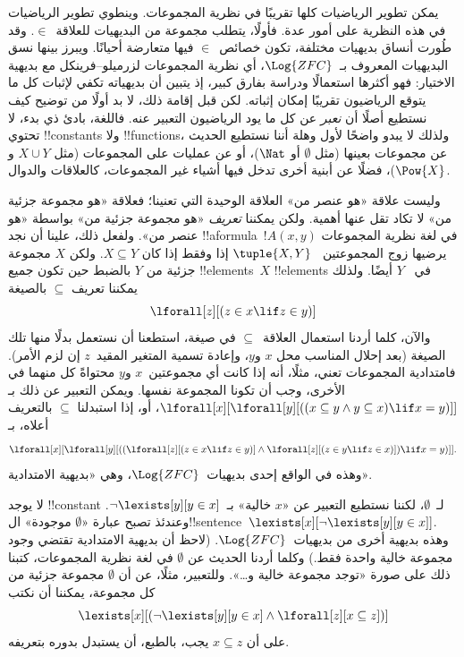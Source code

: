 \documentclass[../../../include/open-logic-section]{subfiles}
\begin{document}


يمكن تطوير الرياضيات كلها تقريبًا في نظرية المجموعات. وينطوي تطوير
الرياضيات في هذه النظرية على أمور عدة. فأولًا، يتطلب مجموعة من
البديهيات للعلاقة~$\in$. وقد طُورت أنساق بديهيات مختلفة، تكون
خصائص~$\in$ فيها متعارضة أحيانًا. ويبرز بينها نسق البديهيات المعروف
بـ~$\Log{ZFC}$، أي نظرية المجموعات لزرميلو--فرينكل مع بديهية
الاختيار: فهو أكثرها استعمالًا ودراسة بفارق كبير، إذ يتبين أن
بديهياته تكفي لإثبات كل ما يتوقع الرياضيون تقريبًا إمكان إثباته. لكن
قبل إقامة ذلك، لا بد أولًا من توضيح كيف نستطيع أصلًا أن
\emph{نعبر} عن كل ما يود الرياضيون التعبير عنه. فاللغة، بادئ ذي بدء،
لا تحتوي !!{constant}s ولا !!{function}s، ولذلك لا يبدو واضحًا لأول
وهلة أننا نستطيع الحديث عن مجموعات بعينها (مثل $\emptyset$ أو
$\Nat$)، أو عن عمليات على المجموعات (مثل $X \cup Y$ و$\Pow{X}$)،
فضلًا عن أبنية أخرى تدخل فيها أشياء غير المجموعات، كالعلاقات والدوال.

وليست علاقة «هو عنصر من» العلاقة الوحيدة التي تعنينا؛ فعلاقة «هو
مجموعة جزئية من» لا تكاد تقل عنها أهمية. ولكن يمكننا \emph{تعريف}
«هو مجموعة جزئية من» بواسطة «هو عنصر من». ولفعل ذلك، علينا أن نجد
!!a{formula}~$!A(x, y)$ في لغة نظرية المجموعات يرضيها زوج المجموعتين
~$\tuple{X, Y}$ إذا وفقط إذا كان $X \subseteq Y$. ولكن $X$ مجموعة
جزئية من $Y$ بالضبط حين تكون جميع !!{element}s~$X$ !!{element}s في
~$Y$ أيضًا. ولذلك يمكننا تعريف $\subseteq$ بالصيغة
\[
\lforall[z][(z \in x \lif z \in y)]
\]
والآن، كلما أردنا استعمال العلاقة~$\subseteq$ في صيغة، استطعنا أن
نستعمل بدلًا منها تلك الصيغة (بعد إحلال المناسب محل $x$ و$y$، وإعادة
تسمية المتغير المقيد~$z$ إن لزم الأمر). فامتدادية المجموعات تعني،
مثلًا، أنه إذا كانت أي مجموعتين~$x$ و$y$ محتواةً كل منهما في الأخرى،
وجب أن تكونا المجموعة نفسها. ويمكن التعبير عن ذلك بـ
$\lforall[x][\lforall[y][((x \subseteq y \land y
    \subseteq x) \lif x = y)]]$، أو، إذا استبدلنا $\subseteq$
بالتعريف أعلاه، بـ
\[
\lforall[x][\lforall[y][((\lforall[z][(z \in x \lif z \in y)] \land
    \lforall[z][(z \in y \lif z \in x)]) \lif x = y)]].
\]
وهذه في الواقع إحدى بديهيات~$\Log{ZFC}$، وهي «بديهية الامتدادية».

لا يوجد !!{constant} لـ~$\emptyset$، لكننا نستطيع التعبير عن «$x$
خالية» بـ~$\lnot \lexists[y][y \in x]$. وعندئذ تصبح عبارة
«$\emptyset$ موجودة» ال!!{sentence}~$\lexists[x][\lnot
\lexists[y][y \in x]]$. وهذه بديهية أخرى من بديهيات~$\Log{ZFC}$.
(لاحظ أن بديهية الامتدادية تقتضي وجود مجموعة خالية واحدة فقط.) وكلما
أردنا الحديث عن $\emptyset$ في لغة نظرية المجموعات، كتبنا ذلك على
صورة «توجد مجموعة خالية و\dots». وللتعبير، مثلًا، عن أن $\emptyset$
مجموعة جزئية من كل مجموعة، يمكننا أن نكتب
\[
\lexists[x][(\lnot\lexists[y][y \in x] \land \lforall[z][x \subseteq
    z])]
\]
على أن $x \subseteq z$ يجب، بالطبع، أن يستبدل بدوره بتعريفه.
\end{document}
